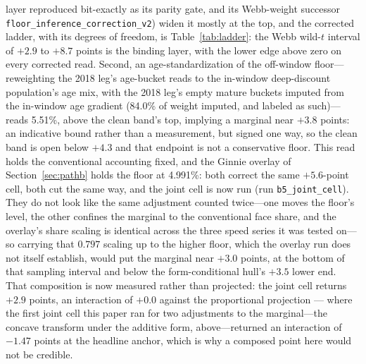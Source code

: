 \documentclass[12pt]{article}
\begin{document}
layer reproduced bit-exactly as its parity gate, and its Webb-weight successor \texttt{floor\_inference\_correction\_v2}) widen it mostly at the top, and the corrected ladder, with its degrees of freedom, is Table~\ref{tab:ladder}: the Webb wild-$t$ interval of $+2.9$ to $+8.7$ points is the binding layer, with the lower edge above zero on every corrected read. Second, an age-standardization of the off-window floor---reweighting the 2018 leg's age-bucket reads to the in-window deep-discount population's age mix, with the 2018 leg's empty mature buckets imputed from the in-window age gradient (84.0\% of weight imputed, and labeled as such)---reads 5.51\%, above the clean band's top, implying a marginal near $+3.8$ points: an indicative bound rather than a measurement, but signed one way, so the clean band is open below $+4.3$ and that endpoint is not a conservative floor. This read holds the conventional accounting fixed, and the Ginnie overlay of Section~\ref{sec:pathb} holds the floor at 4.991\%: both correct the same $+5.6$-point cell, both cut the same way, and the joint cell is now run (run \texttt{b5\_joint\_cell}). They do not look like the same adjustment counted twice---one moves the floor's level, the other confines the marginal to the conventional face share, and the overlay's share scaling is identical across the three speed series it was tested on---so carrying that $0.797$ scaling up to the higher floor, which the overlay run does not itself establish, would put the marginal near $+3.0$ points, at the bottom of that sampling interval and below the form-conditional hull's $+3.5$ lower end. That composition is now measured rather than projected: the joint cell returns $+2.9$ points, an interaction of $+0.0$ against the proportional projection --- where the first joint cell this paper ran for two adjustments to the marginal---the concave transform under the additive form, above---returned an interaction of $-1.47$ points at the headline anchor, which is why a composed point here would not be credible.
\end{document}
